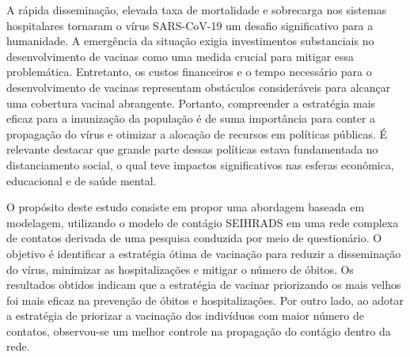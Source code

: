 A rápida disseminação, elevada taxa de mortalidade e sobrecarga nos sistemas hospitalares tornaram o vírus SARS-CoV-19 um desafio significativo para a humanidade. A emergência da situação exigia investimentos substanciais no desenvolvimento de vacinas como uma medida crucial para mitigar essa problemática. Entretanto, os custos financeiros e o tempo necessário para o desenvolvimento de vacinas representam obstáculos consideráveis para alcançar uma cobertura vacinal abrangente. Portanto, compreender a estratégia mais eficaz para a imunização da população é de suma importância para conter a propagação do vírus e otimizar a alocação de recursos em políticas públicas. É relevante destacar que grande parte dessas políticas estava fundamentada no distanciamento social, o qual teve impactos significativos nas esferas econômica, educacional e de saúde mental.

O propósito deste estudo consiste em propor uma abordagem baseada em modelagem, utilizando o modelo de contágio SEIHRADS em uma rede complexa de contatos derivada de uma pesquisa conduzida por meio de questionário. O objetivo é identificar a estratégia ótima de vacinação para reduzir a disseminação do vírus, minimizar as hospitalizações e mitigar o número de óbitos. Os resultados obtidos indicam que a estratégia de vacinar priorizando os mais velhos foi mais eficaz na prevenção de óbitos e hospitalizações. Por outro lado, ao adotar a estratégia de priorizar a vacinação dos indivíduos com maior número de contatos, observou-se um melhor controle na propagação do contágio dentro da rede.

